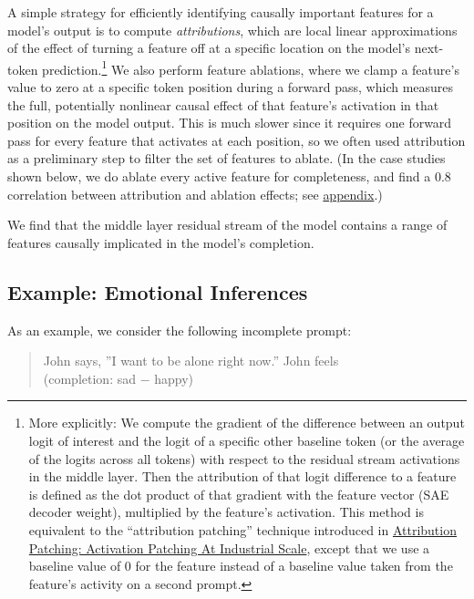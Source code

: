 \documentclass{article}
\let\oldsubsection\subsection
\renewcommand{\subsection}{\FloatBarrier\oldsubsection}
\begin{document}
A simple strategy for efficiently identifying causally important features for a model's output is to compute \textit{attributions}, which are local linear approximations of the effect of turning a feature off at a specific location on the model's next-token prediction.\footnote{More explicitly: We compute the gradient of the difference between an output logit of interest and the logit of a specific other baseline token (or the average of the logits across all tokens) with respect to the residual stream activations in the middle layer. Then the attribution of that logit difference to a feature is defined as the dot product of that gradient with the feature vector (SAE decoder weight), multiplied by the feature's activation. This method is equivalent to the “attribution patching” technique introduced in \href{https://www.neelnanda.io/mechanistic-interpretability/attribution-patching}{Attribution Patching: Activation Patching At Industrial Scale}, except that we use a baseline value of 0 for the feature instead of a baseline value taken from the feature’s activity on a second prompt.} We also perform feature ablations, where we clamp a feature’s value to zero at a specific token position during a forward pass, which measures the full, potentially nonlinear causal effect of that feature’s activation in that position on the model output. This is much slower since it requires one forward pass for every feature that activates at each position, so we often used attribution as a preliminary step to filter the set of features to ablate. (In the case studies shown below, we do ablate every active feature for completeness, and find a 0.8 correlation between attribution and ablation effects; see \hyperref[sec:appendix-ablations]{appendix}.)

We find that the middle layer residual stream of the model contains a range of features causally implicated in the model's completion.

\subsection{Example: Emotional Inferences}\label{sec:computational-sad}

As an example, we consider the following incomplete prompt:

\begin{quote}
John says, ''I want to be alone right now.'' John feels\\
(completion: sad − happy)
\end{quote}
\end{document}
